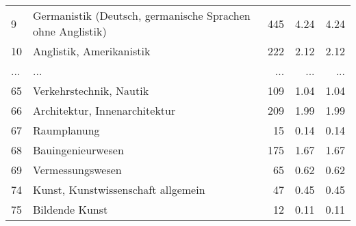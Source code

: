 \begin{longtable}{lXrrr}
        9 & \multicolumn{1}{X}{Germanistik (Deutsch, germanische Sprachen ohne Anglistik)} & %
          \num{445} &
          \num[round-mode=places,round-precision=2]{4.24} &
          \num[round-mode=places,round-precision=2]{4.24} \\
        10 & \multicolumn{1}{X}{Anglistik, Amerikanistik} & %
          \num{222} &
          \num[round-mode=places,round-precision=2]{2.12} &
          \num[round-mode=places,round-precision=2]{2.12} \\
       ... & ... & ... & ... & ... \\
        65 & \multicolumn{1}{X}{Verkehrstechnik, Nautik} & %
          \num{109} &
          \num[round-mode=places,round-precision=2]{1.04} &
          \num[round-mode=places,round-precision=2]{1.04} \\

        66 & \multicolumn{1}{X}{Architektur, Innenarchitektur} & %
          \num{209} &
          \num[round-mode=places,round-precision=2]{1.99} &
          \num[round-mode=places,round-precision=2]{1.99} \\

        67 & \multicolumn{1}{X}{Raumplanung} & %
          \num{15} &
          \num[round-mode=places,round-precision=2]{0.14} &
          \num[round-mode=places,round-precision=2]{0.14} \\

        68 & \multicolumn{1}{X}{Bauingenieurwesen} & %
          \num{175} &
          \num[round-mode=places,round-precision=2]{1.67} &
          \num[round-mode=places,round-precision=2]{1.67} \\

        69 & \multicolumn{1}{X}{Vermessungswesen} & %
          \num{65} &
          \num[round-mode=places,round-precision=2]{0.62} &
          \num[round-mode=places,round-precision=2]{0.62} \\

        74 & \multicolumn{1}{X}{Kunst, Kunstwissenschaft allgemein} & %
          \num{47} &
          \num[round-mode=places,round-precision=2]{0.45} &
          \num[round-mode=places,round-precision=2]{0.45} \\

        75 & \multicolumn{1}{X}{Bildende Kunst} & %
          \num{12} &
          \num[round-mode=places,round-precision=2]{0.11} &
          \num[round-mode=places,round-precision=2]{0.11} \\


\end{longtable}
